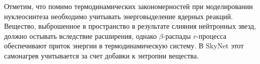 Отметим, что помимо термодинамических закономерностей при моделировании нуклеосинтеза необходимо учитывать энерговыделение ядерных реакций. Вещество, выброшенное в пространство в результате слияния нейтронных звезд, должно остывать вследствие расширения, однако $\beta$-распады $r$-процесса обеспечивают приток энергии в термодинамическую систему. В SkyNet этот самонагрев учитывается за счет добавки к энтропии вещества.
